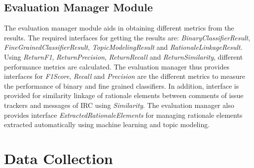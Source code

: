 \documentclass[a4paper,12pt,twoside]{report}
\begin{document}
\section{Evaluation Manager Module}
The evaluation manager module aids in obtaining different metrics from the results. The required interfaces for getting the results are: \textit{BinaryClassifierResult}, \textit{FineGrainedClassifierResult}, \textit{TopicModelingResult} and \textit{RationaleLinkageResult}. Using \textit{ReturnF1}, \textit{ReturnPrecision}, \textit{ReturnRecall} and \textit{ReturnSimilarity}, different performance metrics are calculated. The evaluation manager thus provides interfaces for \textit{F1Score}, \textit{Recall} and \textit{Precision} are the different metrics to measure the performance of binary and fine grained classifiers. In addition, interface is provided for similarity linkage of rationale elements between comments of issue trackers and messages of \acs{IRC} using \textit{Similarity}. The evaluation manager also provides interface \textit{ExtractedRationaleElements} for managing rationale elements extracted automatically using machine learning and topic modeling.


\chapter{Data Collection}
\end{document}
